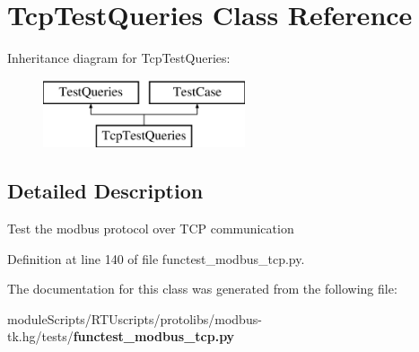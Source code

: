 \section{Tcp\+Test\+Queries Class Reference}
\label{classtests_1_1functest__modbus__tcp_1_1_tcp_test_queries}
Inheritance diagram for Tcp\+Test\+Queries\+:\begin{figure}[H]
\begin{center}
\leavevmode
\includegraphics[height=2.000000cm]{classtests_1_1functest__modbus__tcp_1_1_tcp_test_queries}
\end{center}
\end{figure}


\subsection{Detailed Description}
\begin{DoxyVerb}Test the modbus protocol over TCP communication\end{DoxyVerb}
 

Definition at line 140 of file functest\+\_\+modbus\+\_\+tcp.\+py.



The documentation for this class was generated from the following file\+:\begin{DoxyCompactItemize}
\item 
module\+Scripts/\+R\+T\+Uscripts/protolibs/modbus-\/tk.\+hg/tests/{\bf functest\+\_\+modbus\+\_\+tcp.\+py}\end{DoxyCompactItemize}
